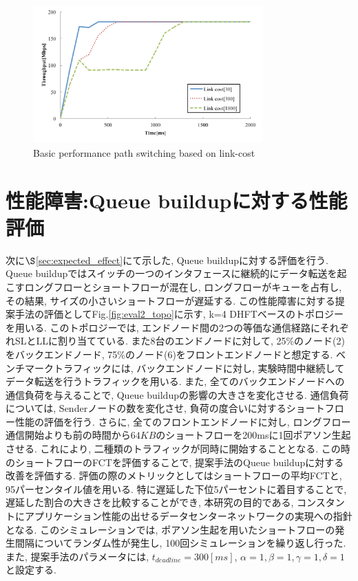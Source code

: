 \begin{figure}[t]
    \begin{center}
    \includegraphics[autoebb, width=250pt]{./img/basic_cost.pdf}
    \caption{Basic performance path switching based on
    link-cost}
    \label{fig:basic_cost}
    \end{center}
\end{figure}


\section{性能障害:Queue buildupに対する性能評価}
次に$\S$\ref{sec:expected_effect}にて示した, Queue buildupに対する評価を行う. 
Queue buildupではスイッチの一つのインタフェースに継続的にデータ転送を起こすロングフローとショートフローが混在し, ロングフローがキューを占有し,
その結果, サイズの小さいショートフローが遅延する. 
この性能障害に対する提案手法の評価としてFig.\ref{fig:eval2_topo}に示す, k=4 DHFTベースのトポロジーを用いる. 
このトポロジーでは, エンドノード間の2つの等価な通信経路にそれぞれSLとLLに割り当てている.
また8台のエンドノードに対して, 25\%のノード(2)をバックエンドノード, 75\%のノード(6)をフロントエンドノードと想定する. 
ベンチマークトラフィックには, バックエンドノードに対し, 実験時間中継続してデータ転送を行うトラフィックを用いる.
また, 全てのバックエンドノードへの通信負荷を与えることで, Queue buildupの影響の大きさを変化させる. 
通信負荷については, Senderノードの数を変化させ, 負荷の度合いに対するショートフロー性能の評価を行う. 
さらに, 全てのフロントエンドノードに対し, ロングフロー通信開始よりも前の時間から$64KB$のショートフローを200msに1回ポアソン生起させる. 
これにより, 二種類のトラフィックが同時に開始することとなる. 
この時のショートフローのFCTを評価することで, 提案手法のQueue buildupに対する改善を評価する. 
評価の際のメトリックとしてはショートフローの平均FCTと, 95パーセンタイル値を用いる. 
特に遅延した下位5パーセントに着目することで, 遅延した割合の大きさを比較することができ, 
本研究の目的である, コンスタントにアプリケーション性能の出せるデータセンターネットワークの実現への指針となる.
このシミュレーションでは, ポアソン生起を用いたショートフローの発生間隔についてランダム性が発生し, 100回シミュレーションを繰り返し行った. 
また, 提案手法のパラメータには, $t_{deadline}=300[ms]$, $\alpha=1, \beta=1, \gamma=1, \delta=1$と設定する.

